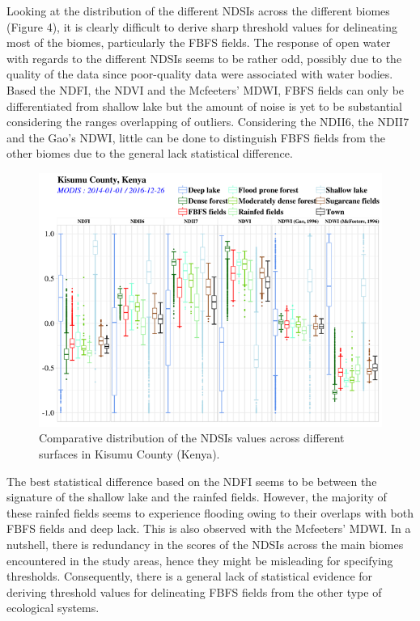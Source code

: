\documentclass[12pt,oneside]{article}
\begin{document}
Looking at the distribution of the different NDSIs across the different biomes (Figure 4), it is clearly difficult to derive sharp threshold values for delineating most of the biomes, particularly the FBFS fields. The response of open water with regards to the different NDSIs seems to be rather odd, possibly due to the quality of the data since poor-quality data were associated with water bodies. Based the NDFI, the NDVI and the Mcfeeters' MDWI, FBFS fields can only be differentiated from shallow lake but the amount of noise is yet to be substantial considering the ranges overlapping of outliers. Considering the NDII6, the NDII7 and the Gao's NDWI, little can be done to distinguish FBFS fields from the other biomes due to the general lack statistical difference.

\begin{figure}
\includegraphics[width=1\linewidth]{figures/Mapping_FBFS_ndsi_accross_features} \caption{Comparative distribution of the NDSIs values across different surfaces in Kisumu County (Kenya).}\label{fig:fig4}
\end{figure}

The best statistical difference based on the NDFI seems to be between the signature of the shallow lake and the rainfed fields. However, the majority of these rainfed fields seems to experience flooding owing to their overlaps with both FBFS fields and deep lack. This is also observed with the Mcfeeters' MDWI. In a nutshell, there is redundancy in the scores of the NDSIs across the main biomes encountered in the study areas, hence they might be misleading for specifying thresholds. Consequently, there is a general lack of statistical evidence for deriving threshold values for delineating FBFS fields from the other type of ecological systems.
\end{document}
